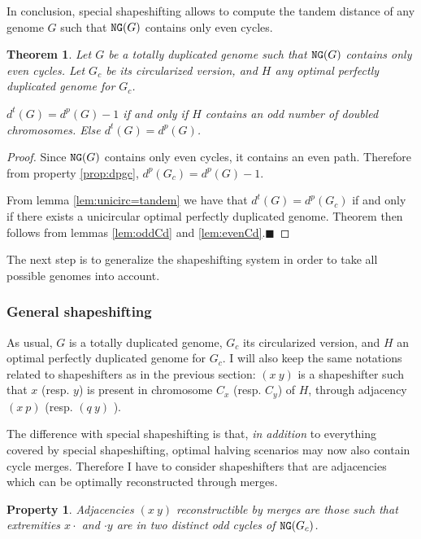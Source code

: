 \documentclass[11pt,final,twoside,nofrench]{thlifl}
\newcommand{\qed}{\ensuremath{\blacksquare}}
\newcommand{\fst}[1]{ \ensuremath{#1} }
\newcommand\aff[2]{\ensuremath{(\fst{#1}~\fst{#2})}}
\renewcommand{\NG}{\ensuremath{\mbox{\texttt{NG}}}}
\newtheorem{property}{Property}
\newtheorem{proof}{Proof}
\newtheorem{theorem}{Theorem}
\begin{document}
In conclusion, special shapeshifting allows to compute the tandem distance of any genome $G$ such that $\NG(G)$ contains only even cycles.
 \begin{theorem}
\label{th:restricted}
Let $G$ be a totally duplicated genome such that $\NG(G)$ contains only even cycles.
Let $G_c$ be its circularized version, and $H$ any optimal perfectly duplicated genome for $G_c$.

$d^t(G) = d^p(G)-1$ if and only if $H$ contains an odd number of doubled chromosomes. Else $d^t(G) = d^p(G)$.
\end{theorem}

\begin{proof} 
Since $\NG(G)$ contains only even cycles, it contains an even path. Therefore from property \ref{prop:dpgc}, $d^p(G_c) = d^p(G)-1$.

From lemma \ref{lem:unicirc=tandem} we have that $d^t(G) = d^p(G_c)$ if and only if there exists a unicircular optimal perfectly duplicated genome.
Theorem then follows from lemmas \ref{lem:oddCd} and \ref{lem:evenCd}.\qed 
\end{proof}

The next step is to generalize the shapeshifting system in order to take all possible genomes into account.

\subsubsection{General shapeshifting}

As usual, $G$ is a totally duplicated genome, $G_c$ its circularized version, and $H$ an optimal perfectly duplicated genome for $G_c$.
I will also keep the same notations related to shapeshifters as in the previous section: \aff{x}{y} is a shapeshifter such that $x$ (resp. $y$) is present in chromosome $C_x$ (resp. $C_y$) of $H$, through adjacency \aff{x}{p} (resp. \aff{q}{y} ).

The difference with special shapeshifting is that, \emph{in addition} to everything covered by special shapeshifting, optimal halving scenarios may now also contain cycle merges. Therefore I have to consider shapeshifters that are adjacencies which can be optimally reconstructed through merges.

\begin{property}
Adjacencies \aff{x}{y} reconstructible by merges are those such that extremities $x\cdot$ and $\cdot y$ are in \emph{two distinct odd cycles} of $\NG(G_c)$.
\end{property}
\end{document}

